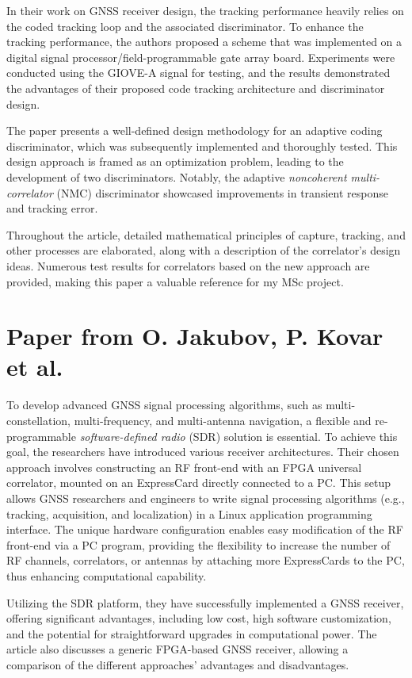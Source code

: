 In their work on GNSS receiver design, the tracking performance heavily relies on the coded tracking loop and the associated discriminator. To enhance the tracking performance, the authors proposed a scheme that was implemented on a digital signal processor/field-programmable gate array board. Experiments were conducted using the GIOVE-A signal for testing, and the results demonstrated the advantages of their proposed code tracking architecture and discriminator design.

The paper presents a well-defined design methodology for an adaptive coding discriminator, which was subsequently implemented and thoroughly tested. This design approach is framed as an optimization problem, leading to the development of two discriminators. Notably, the adaptive \textit{noncoherent multi-correlator} (NMC) discriminator showcased improvements in transient response and tracking error.

Throughout the article, detailed mathematical principles of capture, tracking, and other processes are elaborated, along with a description of the correlator's design ideas. Numerous test results for correlators based on the new approach are provided, making this paper a valuable reference for my MSc project.

\section{Paper from O. Jakubov, P. Kovar et al.\texorpdfstring{\cite{RN155}}{}}
To develop advanced GNSS signal processing algorithms, such as multi-constellation, multi-frequency, and multi-antenna navigation, a flexible and re-programmable \textit{software-defined radio} (SDR) solution is essential. To achieve this goal, the researchers have introduced various receiver architectures. Their chosen approach involves constructing an RF front-end with an FPGA universal correlator, mounted on an ExpressCard directly connected to a PC. This setup allows GNSS researchers and engineers to write signal processing algorithms (e.g., tracking, acquisition, and localization) in a Linux application programming interface. The unique hardware configuration enables easy modification of the RF front-end via a PC program, providing the flexibility to increase the number of RF channels, correlators, or antennas by attaching more ExpressCards to the PC, thus enhancing computational capability.

Utilizing the SDR platform, they have successfully implemented a GNSS receiver, offering significant advantages, including low cost, high software customization, and the potential for straightforward upgrades in computational power. The article also discusses a generic FPGA-based GNSS receiver, allowing a comparison of the different approaches' advantages and disadvantages.


